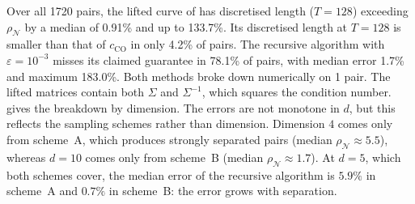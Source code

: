 Over all 1720 pairs, the lifted curve of \citet{NielsenPMLR2023} has discretised length ($T=128$) exceeding $\rho_\mathcal{N}$ by a median of 0.91\% and up to 133.7\%. Its discretised length at $T=128$ is smaller than that of $c_{\mathrm{CO}}$ in only 4.2\% of pairs. The recursive algorithm with $\varepsilon=10^{-3}$ misses its claimed guarantee in 78.1\% of pairs, with median error 1.7\% and maximum 183.0\%. Both methods broke down numerically on 1 pair. The lifted matrices contain both $\Sigma$ and $\Sigma^{-1}$, which squares the condition number.  gives the breakdown by dimension. The errors are not monotone in $d$, but this reflects the sampling schemes rather than dimension. Dimension $4$ comes only from scheme~A, which produces strongly separated pairs (median $\rho_\mathcal{N}\approx5.5$), whereas $d=10$ comes only from scheme~B (median $\rho_\mathcal{N}\approx1.7$). At $d=5$, which both schemes cover, the median error of the recursive algorithm is $5.9\%$ in scheme~A and $0.7\%$ in scheme~B: the error grows with separation.